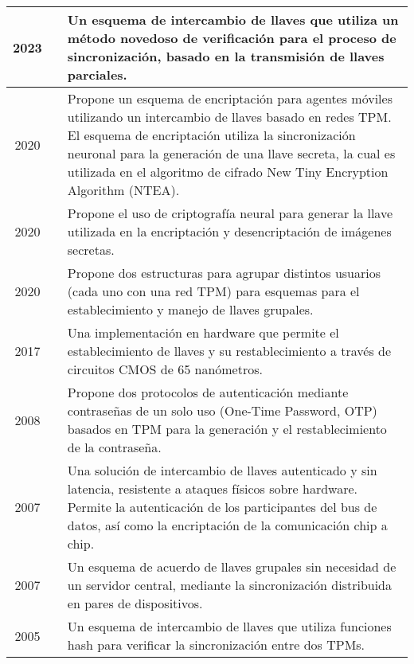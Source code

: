 \begin{longtable}{|c|p{2cm}|p{8.5cm}|}
    2023 & \cite{dey-2023} & Un esquema de intercambio de llaves que utiliza un método novedoso de verificación para el proceso de sincronización, basado en la transmisión de llaves parciales. \\
    \hline
    2020 & \cite{inbook} & Propone un esquema de encriptación para agentes móviles utilizando un intercambio de llaves basado en redes TPM. El esquema de encriptación utiliza la sincronización neuronal para la generación de una llave secreta, la cual es utilizada en el algoritmo de cifrado New Tiny Encryption Algorithm (NTEA). \\
    \hline
    2020 & \cite{secret_img} & Propone el uso de criptografía neural para generar la llave utilizada en la encriptación y desencriptación de imágenes secretas. \\
    \hline
    2020 & \cite{group_key_2020} & Propone dos estructuras para agrupar distintos usuarios (cada uno con una red TPM) para esquemas para el establecimiento y manejo de llaves grupales. \\
    \hline
    2017 & \cite{65_CMOS} & Una implementación en hardware que permite el establecimiento de llaves y su restablecimiento a través de circuitos CMOS de 65 nanómetros. \\
    \hline
    2008 & \cite{chenTreeParityMachinebased2008} & Propone dos protocolos de autenticación mediante contraseñas de un solo uso (One-Time Password, OTP) basados en TPM para la generación y el restablecimiento de la contraseña. \\
    \hline
    2007 & \cite{muhlbachSecureAuthenticatedCommunication2007} & Una solución de intercambio de llaves autenticado y sin latencia, resistente a ataques físicos sobre hardware. Permite la autenticación de los participantes del bus de datos, así como la encriptación de la comunicación chip a chip. \\
    \hline
    2007 & \cite{secure_ad_hoc} & Un esquema de acuerdo de llaves grupales sin necesidad de un servidor central, mediante la sincronización distribuida en pares de dispositivos. \\
    \hline
    2005 & \cite{chen-2005} & Un esquema de intercambio de llaves que utiliza funciones hash para verificar la sincronización entre dos TPMs. \\
    \hline
    
\end{longtable}


